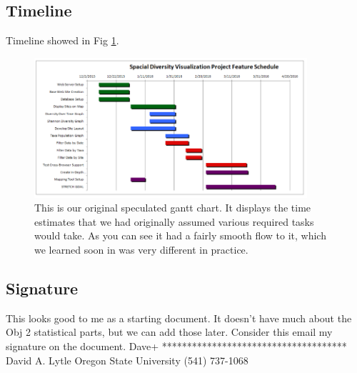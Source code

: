 \subsection{Timeline}
Timeline showed in Fig \ref{fig:original_gantt}.
\begin{figure}[h]
\centering
\includegraphics[width=0.9\textwidth]{OriginalGantt.png}
\captionsetup{justification=centering}
\caption{
  This is our original speculated gantt chart.
  It displays the time estimates that we had originally assumed various required tasks would take.
  As you can see it had a fairly smooth flow to it, which we learned soon in was very different in practice.
}
\label{fig:original_gantt}
\end{figure}

\subsection{Signature}
This looks good to me as a starting document. It doesn't have much about the Obj 2 statistical parts, but we can add those later. Consider this email my signature on the document.
Dave+
*************************************
David A. Lytle
Oregon State University
(541) 737-1068
